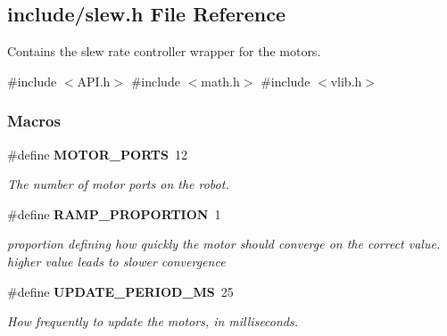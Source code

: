 \subsection{include/slew.h File Reference}
\label{slew_8h}


Contains the slew rate controller wrapper for the motors.  


{\ttfamily \#include $<$A\+P\+I.\+h$>$}\newline
{\ttfamily \#include $<$math.\+h$>$}\newline
{\ttfamily \#include $<$vlib.\+h$>$}\newline
\subsubsection*{Macros}
\begin{DoxyCompactItemize}
\item 
\#define \textbf{ M\+O\+T\+O\+R\+\_\+\+P\+O\+R\+TS}~12
\begin{DoxyCompactList}\small\item\em The number of motor ports on the robot. \end{DoxyCompactList}\item 
\#define \textbf{ R\+A\+M\+P\+\_\+\+P\+R\+O\+P\+O\+R\+T\+I\+ON}~1
\begin{DoxyCompactList}\small\item\em proportion defining how quickly the motor should converge on the correct value. higher value leads to slower convergence \end{DoxyCompactList}\item 
\#define \textbf{ U\+P\+D\+A\+T\+E\+\_\+\+P\+E\+R\+I\+O\+D\+\_\+\+MS}~25
\begin{DoxyCompactList}\small\item\em How frequently to update the motors, in milliseconds. \end{DoxyCompactList}\end{DoxyCompactItemize}
